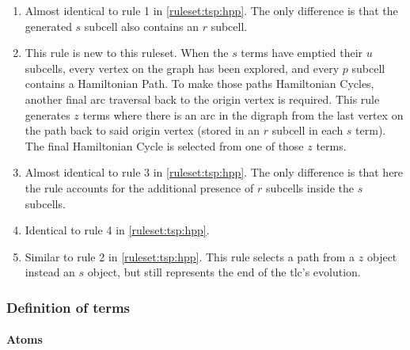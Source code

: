\begin{enumerate}
    \item Almost identical to rule 1 in \cref{ruleset:tsp:hpp}.  The only difference is that the generated \(s\) subcell also contains an \(r\) subcell.
    \item This rule is new to this \gls{ruleset}.  When the \(s\) terms have emptied their \(u\) subcells, every vertex on the graph has been explored, and every \(p\) subcell contains a Hamiltonian Path.  To make those paths Hamiltonian Cycles, another final arc traversal back to the origin vertex is required.  This rule generates \(z\) terms where there is an arc in the digraph from the last vertex on the path back to said origin vertex (stored in an \(r\) subcell in each \(s\) term).  The final Hamiltonian Cycle is selected from one of those \(z\) terms.
    \item Almost identical to rule 3 in \cref{ruleset:tsp:hpp}.  The only difference is that here the rule accounts for the additional presence of \(r\) subcells inside the \(s\) subcells.
    \item Identical to rule 4 in \cref{ruleset:tsp:hpp}.
    \item Similar to rule 2 in \cref{ruleset:tsp:hpp}.  This rule selects a path from a \(z\) object instead an \(s\) object, but still represents the end of the \gls{tlc}'s evolution.
\end{enumerate}

\subsubsection{Definition of terms}

\paragraph{Atoms}
\begin{description}
\end{description}

